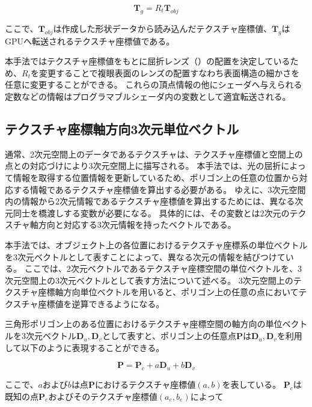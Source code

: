 \begin{equation}
{\bm T_g} = R_t{\bm T_{obj}}
\end{equation}

\noindent
ここで、$\bm{T}_{obj}$は作成した形状データから読み込んだテクスチャ座標値、$\bm{T}_g$はGPUへ転送されるテクスチャ座標値である。

本手法ではテクスチャ座標値をもとに屈折レンズ（）の配置を決定しているため、$R_t$を変更することで複眼表面のレンズの配置すなわち表面構造の細かさを任意に変更することができる。
これらの頂点情報の他にシェーダへ与えられる定数などの情報はプログラマブルシェーダ内の変数として適宜転送される。

\subsection{テクスチャ座標軸方向3次元単位ベクトル}
\label{SSUnitvec}

通常、2次元空間上のデータであるテクスチャは、テクスチャ座標値と空間上の点との対応づけにより3次元空間上に描写される。
本手法では、光の屈折によって情報を取得する位置情報を更新しているため、ポリゴン上の任意の位置から対応する情報であるテクスチャ座標値を算出する必要がある。
ゆえに、3次元空間内の情報から2次元情報であるテクスチャ座標値を算出するためには、異なる次元同士を橋渡しする変数が必要になる。
具体的には、その変数とは2次元のテクスチャ軸方向と対応する3次元情報を持ったベクトルである。

本手法では、オブジェクト上の各位置におけるテクスチャ座標系の単位ベクトルを3次元ベクトルとして表すことによって、異なる次元の情報を結びつけている。
ここでは、2次元ベクトルであるテクスチャ座標空間の単位ベクトルを、3次元空間上の3次元ベクトルとして表す方法について述べる。
3次元空間上のテクスチャ座標軸方向単位ベクトルを用いると、ポリゴン上の任意の点においてテクスチャ座標値を逆算できるようになる。

三角形ポリゴン上のある位置におけるテクスチャ座標空間の軸方向の単位ベクトルを3次元ベクトル$\bm{D}_u, \bm{D}_v$として表すと、ポリゴン上の任意点$\bm{P}$は$\bm{D}_u, \bm{D}_v$を利用して以下のように表現することができる。

\begin{equation}
\bm{P} = \bm{P}_c + a\bm{D}_u + b\bm{D}_v
\label{EPuv}
\end{equation}

\noindent
ここで、$a$および$b$は点$\bm{P}$におけるテクスチャ座標値$(a, b)$を表している。
$\bm{P}_c$は既知の点$\bm{P}_e$およびそのテクスチャ座標値$(a_e, b_e)$によって

